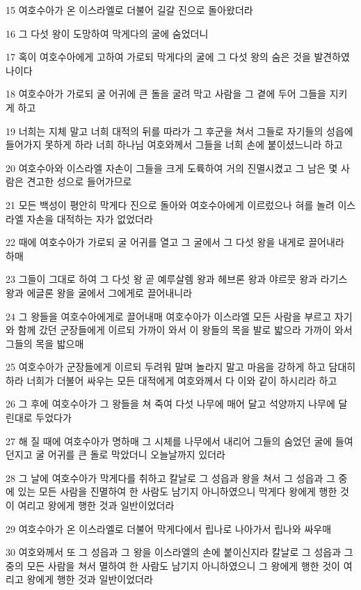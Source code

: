\par 15 여호수아가 온 이스라엘로 더불어 길갈 진으로 돌아왔더라
\par 16 그 다섯 왕이 도망하여 막게다의 굴에 숨었더니
\par 17 혹이 여호수아에게 고하여 가로되 막게다의 굴에 그 다섯 왕의 숨은 것을 발견하였나이다
\par 18 여호수아가 가로되 굴 어귀에 큰 돌을 굴려 막고 사람을 그 곁에 두어 그들을 지키게 하고
\par 19 너희는 지체 말고 너희 대적의 뒤를 따라가 그 후군을 쳐서 그들로 자기들의 성읍에 들어가지 못하게 하라 너희 하나님 여호와께서 그들을 너희 손에 붙이셨느니라 하고
\par 20 여호수아와 이스라엘 자손이 그들을 크게 도륙하여 거의 진멸시켰고 그 남은 몇 사람은 견고한 성으로 들어가므로
\par 21 모든 백성이 평안히 막게다 진으로 돌아와 여호수아에게 이르렀으나 혀를 놀려 이스라엘 자손을 대적하는 자가 없었더라
\par 22 때에 여호수아가 가로되 굴 어귀를 열고 그 굴에서 그 다섯 왕을 내게로 끌어내라 하매
\par 23 그들이 그대로 하여 그 다섯 왕 곧 예루살렘 왕과 헤브론 왕과 야르뭇 왕과 라기스 왕과 에글론 왕을 굴에서 그에게로 끌어내니라
\par 24 그 왕들을 여호수아에게로 끌어내매 여호수아가 이스라엘 모든 사람을 부르고 자기와 함께 갔던 군장들에게 이르되 가까이 와서 이 왕들의 목을 발로 밟으라 가까이 와서 그들의 목을 밟으매
\par 25 여호수아가 군장들에게 이르되 두려워 말며 놀라지 말고 마음을 강하게 하고 담대히 하라 너희가 더불어 싸우는 모든 대적에게 여호와께서 다 이와 같이 하시리라 하고
\par 26 그 후에 여호수아가 그 왕들을 쳐 죽여 다섯 나무에 매어 달고 석양까지 나무에 달린대로 두었다가
\par 27 해 질 때에 여호수아가 명하매 그 시체를 나무에서 내리어 그들의 숨었던 굴에 들여 던지고 굴 어귀를 큰 돌로 막았더니 오늘날까지 있더라
\par 28 그 날에 여호수아가 막게다를 취하고 칼날로 그 성읍과 왕을 쳐서 그 성읍과 그 중에 있는 모든 사람을 진멸하여 한 사람도 남기지 아니하였으니 막게다 왕에게 행한 것이 여리고 왕에게 행한 것과 일반이었더라
\par 29 여호수아가 온 이스라엘로 더불어 막게다에서 립나로 나아가서 립나와 싸우매
\par 30 여호와께서 또 그 성읍과 그 왕을 이스라엘의 손에 붙이신지라 칼날로 그 성읍과 그 중의 모든 사람을 쳐서 멸하여 한 사람도 남기지 아니하였으니 그 왕에게 행한 것이 여리고 왕에게 행한 것과 일반이었더라
